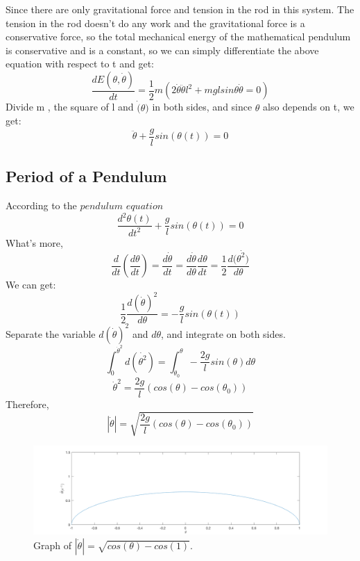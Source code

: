 \documentclass[12pt,a4paper]{article}
\begin{document}
Since there are only gravitational force and tension in the rod in this system. The tension in the rod doesn’t do any work and the gravitational force is a conservative force, so the total mechanical energy of the mathematical pendulum is conservative and is a constant, so we can simply differentiate the above equation with respect to t and get:\\
$$\frac{dE(\theta,\dot{\theta})}{dt}=\frac{1}{2}m(2\dot{\theta}\ddot{\theta}l^2+mglsin\theta\dot{\theta}=0)$$
Divide m , the square of l and $\dot(\theta)$ in both sides, and since $\theta$ also depends on t, we get:
\begin{equation}
\ddot{\theta}+\frac{g}{l}sin(\theta(t))=0
\end{equation}
\subsection{Period of a Pendulum}
According to the $pendulum$ $equation$
$$\frac{d^2\theta(t)}{dt^2}+\frac{g}{l}sin(\theta(t))=0$$
What's more,
$$\frac{d}{dt}(\frac{d\theta}{dt})=\frac{d\dot \theta}{dt}=\frac{d\dot \theta}{d\theta}\frac{d\theta}{dt}=\frac{1}{2}\frac{d(\dot {\theta^2)}}{d\theta}$$
We can get:
$$\frac{1}{2}\frac{d(\dot \theta)^2}{d\theta}=-\frac{g}{l}sin(\theta(t))$$
Separate the variable $d(\dot \theta)^2$ and $d\theta$, and integrate on both sides.
$$\int_0^{\dot \theta^2} d(\dot{ \theta^2})=\int_{\theta_0}^\theta-\frac{2g}{l}sin(\theta)d\theta$$
$$\dot \theta^2=\frac{2g}{l}(cos(\theta)-cos(\theta_0))$$
Therefore, $$|\dot \theta|=\sqrt{\frac{2g}{l}(cos(\theta)-cos(\theta_0))}$$
\begin{figure}[H]
\centering
\includegraphics[width=\textwidth]{w.png}
\caption{Graph of $|\dot \theta|=\sqrt{cos(\theta)-cos(1)}$.}
\end{figure} 
\end{document}
